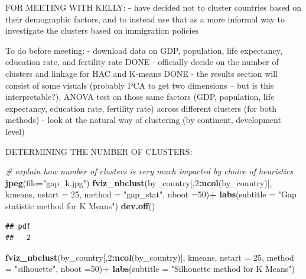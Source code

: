 \documentclass[]{article}
\newenvironment{Shaded}{\begin{snugshade}}{\end{snugshade}}
\newcommand{\CommentTok}[1]{\textcolor[rgb]{0.56,0.35,0.01}{\textit{#1}}}
\newcommand{\DataTypeTok}[1]{\textcolor[rgb]{0.13,0.29,0.53}{#1}}
\newcommand{\DecValTok}[1]{\textcolor[rgb]{0.00,0.00,0.81}{#1}}
\newcommand{\KeywordTok}[1]{\textcolor[rgb]{0.13,0.29,0.53}{\textbf{#1}}}
\newcommand{\NormalTok}[1]{#1}
\newcommand{\OperatorTok}[1]{\textcolor[rgb]{0.81,0.36,0.00}{\textbf{#1}}}
\newcommand{\StringTok}[1]{\textcolor[rgb]{0.31,0.60,0.02}{#1}}
\begin{document}
FOR MEETING WITH KELLY: - have decided not to cluster countries based on
their demographic factors, and to instead use that as a more informal
way to investigate the clusters based on immigration policies

To do before meeting: - download data on GDP, population, life
expectancy, education rate, and fertility rate DONE - officially decide
on the number of clusters and linkage for HAC and K-means DONE - the
results section will consist of some visuals (probably PCA to get two
dimensions -- but is this interpretable?), ANOVA test on those same
factors (GDP, population, life expectancy, education rate, fertility
rate) across different clusters (for both methods) - look at the natural
way of clustering (by continent, development level)

DETERMINING THE NUMBER OF CLUSTERS:

\begin{Shaded}
\begin{Highlighting}[]
\CommentTok{# explain how number of clusters is very much impacted by choice of heuristics}
\KeywordTok{jpeg}\NormalTok{(}\DataTypeTok{file=}\StringTok{"gap_k.jpg"}\NormalTok{)}
\KeywordTok{fviz_nbclust}\NormalTok{(by_country[,}\DecValTok{2}\OperatorTok{:}\KeywordTok{ncol}\NormalTok{(by_country)], kmeans, }\DataTypeTok{nstart =} \DecValTok{25}\NormalTok{,  }\DataTypeTok{method =} \StringTok{"gap_stat"}\NormalTok{, }
             \DataTypeTok{nboot =}\DecValTok{50}\NormalTok{)}\OperatorTok{+}\StringTok{ }\KeywordTok{labs}\NormalTok{(}\DataTypeTok{subtitle =} \StringTok{"Gap statistic method for K Means"}\NormalTok{)}
\KeywordTok{dev.off}\NormalTok{()}
\end{Highlighting}
\end{Shaded}

\begin{verbatim}
## pdf 
##   2
\end{verbatim}

\begin{Shaded}
\begin{Highlighting}[]
\KeywordTok{fviz_nbclust}\NormalTok{(by_country[,}\DecValTok{2}\OperatorTok{:}\KeywordTok{ncol}\NormalTok{(by_country)], kmeans, }\DataTypeTok{nstart =} \DecValTok{25}\NormalTok{,  }\DataTypeTok{method =} \StringTok{"silhouette"}\NormalTok{, }
             \DataTypeTok{nboot =}\DecValTok{50}\NormalTok{)}\OperatorTok{+}\StringTok{ }\KeywordTok{labs}\NormalTok{(}\DataTypeTok{subtitle =} \StringTok{"Silhouette method for K Means"}\NormalTok{)}
\end{Highlighting}
\end{Shaded}
\end{document}
